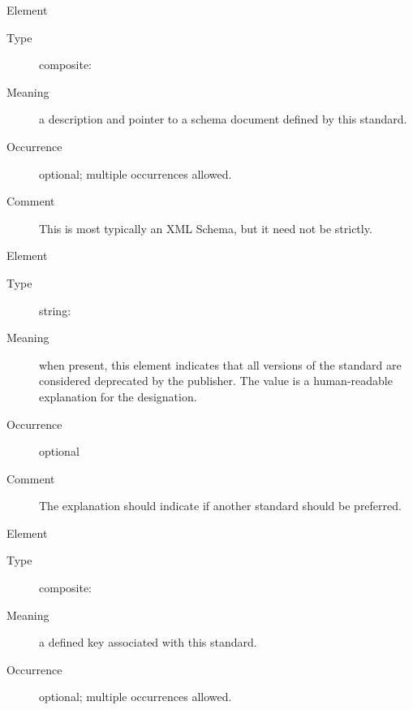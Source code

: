 \documentclass[11pt,a4paper]{ivoa}
\begin{document}
\begin{generated}
\begin{bigdescription}
\begin{description}
\end{description}
\item[Element \xmlel{schema}]
\begin{description}
\item[Type] composite: 
\item[Meaning] 
                     a description and pointer to a schema document
                     defined by this standard.
                   
\item[Occurrence] optional; multiple occurrences allowed.
\item[Comment] 
                     This is most typically an XML Schema, but it need
                     not be strictly.  
                   

\end{description}
\item[Element \xmlel{deprecated}]
\begin{description}
\item[Type] string: 
\item[Meaning] 
                     when present, this element indicates that all
                     versions of the standard are considered
                     deprecated by the publisher.  The value is a 
                     human-readable explanation for the designation.
                   
\item[Occurrence] optional
\item[Comment] 
                     The explanation should indicate if another
                     standard should be preferred.  
                   

\end{description}
\item[Element \xmlel{key}]
\begin{description}
\item[Type] composite: 
\item[Meaning] 
                     a defined key associated with this standard.
                   
\item[Occurrence] optional; multiple occurrences allowed.

\end{description}


\end{bigdescription}\endgroup

\endgroup
\end{generated}
\end{document}
